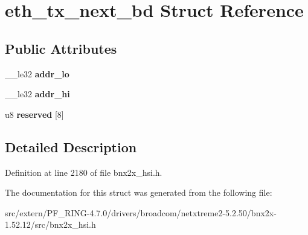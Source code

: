 \hypertarget{structeth__tx__next__bd}{
\section{eth\_\-tx\_\-next\_\-bd Struct Reference}
\label{structeth__tx__next__bd}
}
\subsection*{Public Attributes}
\begin{DoxyCompactItemize}
\item 
\hypertarget{structeth__tx__next__bd_aed48f09d2404d31f4b4251534ddfbe18}{
\_\-\_\-le32 {\bfseries addr\_\-lo}}
\label{structeth__tx__next__bd_aed48f09d2404d31f4b4251534ddfbe18}

\item 
\hypertarget{structeth__tx__next__bd_a723330f33c42f77e5c94321d6e1ea6ff}{
\_\-\_\-le32 {\bfseries addr\_\-hi}}
\label{structeth__tx__next__bd_a723330f33c42f77e5c94321d6e1ea6ff}

\item 
\hypertarget{structeth__tx__next__bd_a628fa5d88f12c84eb725a65fb17c9684}{
u8 {\bfseries reserved} \mbox{[}8\mbox{]}}
\label{structeth__tx__next__bd_a628fa5d88f12c84eb725a65fb17c9684}

\end{DoxyCompactItemize}


\subsection{Detailed Description}


Definition at line 2180 of file bnx2x\_\-hsi.h.



The documentation for this struct was generated from the following file:\begin{DoxyCompactItemize}
\item 
src/extern/PF\_\-RING-\/4.7.0/drivers/broadcom/netxtreme2-\/5.2.50/bnx2x-\/1.52.12/src/bnx2x\_\-hsi.h\end{DoxyCompactItemize}
